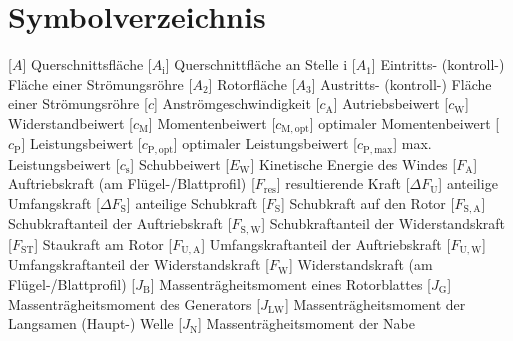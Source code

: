 \documentclass[
	pagesize,
	fontsize=12pt,
	paper=a4,
	oneside,
    reqno
]{scrartcl}
\numberwithin{equation}{section} %
\numberwithin{table}{section} %
\numberwithin{figure}{section} %
\begin{document}
\section*{Symbolverzeichnis}
\begin{acronym}[Symbols]
            [$A$]                       {Querschnittsfläche}
           [$A_{\mathrm{i}}$]          {Querschnittfläche an Stelle i}    
           [$A_{\mathrm{1}}$]          {Eintritts- (kontroll-) Fläche einer Strömungsröhre}
           [$A_{\mathrm{2}}$]          {Rotorfläche}
           [$A_{\mathrm{3}}$]          {Austritts- (kontroll-) Fläche einer Strömungsröhre}
            [$c$]                       {Anströmgeschwindigkeit}
           [$c_{\mathrm{A}}$]          {Autriebsbeiwert}
           [$c_{\mathrm{W}}$]          {Widerstandbeiwert}
           [$c_{\mathrm{M}}$]          {Momentenbeiwert}
        [$c_{\mathrm{M,opt}}$]      {optimaler Momentenbeiwert}
           [$c_{\mathrm{P}}$]          {Leistungsbeiwert}
        [$c_{\mathrm{P,opt}}$]      {optimaler Leistungsbeiwert}
        [$c_{\mathrm{P,max}}$]      {max. Leistungsbeiwert}
           [$c_{\mathrm{s}}$]          {Schubbeiwert}
           [$E_{\mathrm{W}}$]          {Kinetische Energie des Windes}
           [$F_{\mathrm{A}}$]          {Auftriebskraft (am Flügel-/Blattprofil)}
         [$F_{\mathrm{res}}$]        {resultierende Kraft}
      [$\Delta F_{\mathrm{U}}$]   {anteilige Umfangskraft}
      [$\Delta F_{\mathrm{S}}$]   {anteilige Schubkraft}
           [$F_{\mathrm{S}}$]          {Schubkraft auf den Rotor}
          [$F_{\mathrm{S,A}}$]        {Schubkraftanteil der Auftriebskraft}
          [$F_{\mathrm{S,W}}$]        {Schubkraftanteil der Widerstandskraft}
          [$F_{\mathrm{ST}}$]         {Staukraft am Rotor}
          [$F_{\mathrm{U,A}}$]        {Umfangskraftanteil der Auftriebskraft}
          [$F_{\mathrm{U,W}}$]        {Umfangskraftanteil der Widerstandskraft}
           [$F_{\mathrm{W}}$]          {Widerstandskraft (am Flügel-/Blattprofil)}
           [$J_{\mathrm{B}}$]          {Massenträgheitsmoment eines Rotorblattes}
           [$J_{\mathrm{G}}$]          {Massenträgheitsmoment des Generators}
          [$J_{\mathrm{LW}}$]         {Massenträgheitsmoment der Langsamen (Haupt-) Welle}
           [$J_{\mathrm{N}}$]          {Massenträgheitsmoment der Nabe}

\end{acronym}
\end{document}
